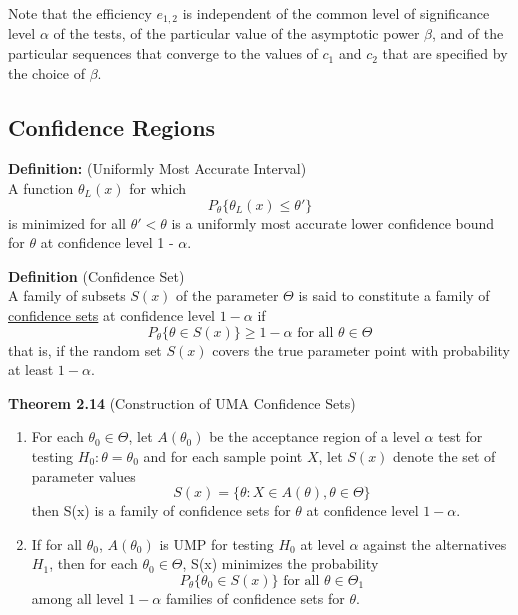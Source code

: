\documentclass[12pt]{article}
\numberwithin{equation}{section}
\begin{document}
Note that the efficiency $e_{1, 2}$ is independent of the common level of significance level $\alpha$ of the tests, of the particular value of the asymptotic power $\beta$, and of the particular sequences that converge to the values of $c_1$ and $c_2$ that are specified by the choice of $\beta$. 


\subsection{Confidence Regions}
\textbf{Definition:} (Uniformly Most Accurate Interval) \\
A function $\theta_L(x)$ for which 
\begin{equation*}
  P_{\theta}\{\theta_L(x) \le \theta' \}
\end{equation*}
is minimized for all $\theta' < \theta$ is a uniformly most accurate lower confidence bound for $\theta$ at confidence level 1 - $\alpha$. 

\textbf{Definition} (Confidence Set) \\
A family of subsets $S(x)$ of the parameter $\Theta$ is said to constitute a family of \underline{confidence sets} at confidence level $1 - \alpha$ if
\begin{equation*}
  P_{\theta}\{\theta \in S(x) \} \ge 1 - \alpha \text{ for all } \theta \in \Theta
\end{equation*}
%
that is, if the random set $S(x)$ covers the true parameter point with probability at least $1 - \alpha$. 

\textbf{Theorem 2.14} (Construction of UMA Confidence Sets) \\
\begin{enumerate}[(i.)]
  \item For each $\theta_0 \in \Theta$, let $A(\theta_0)$ be the acceptance region of a level $\alpha$ test for testing $H_0: \theta = \theta_0$ and for each sample point $X$, let $S(x)$ denote the set of parameter values
  \begin{equation*}
    S(x) = \{ \theta : X \in A(\theta), \theta \in \Theta \}
  \end{equation*}
  then S(x) is a family of confidence sets for $\theta$ at confidence level $1 - \alpha$.
  \item If for all $\theta_0$, $A(\theta_0)$ is UMP for testing $H_0$ at level $\alpha$ against the alternatives $H_1$, then for each $\theta_0 \in \Theta$, S(x) minimizes the probability
  \begin{equation*}
    P_{\theta} \{ \theta_0 \in S(x) \} \text{  for all } \theta \in \Theta_1
  \end{equation*}
  among all level $1 - \alpha$ families of confidence sets for $\theta$.
\end{enumerate}
\end{document}
